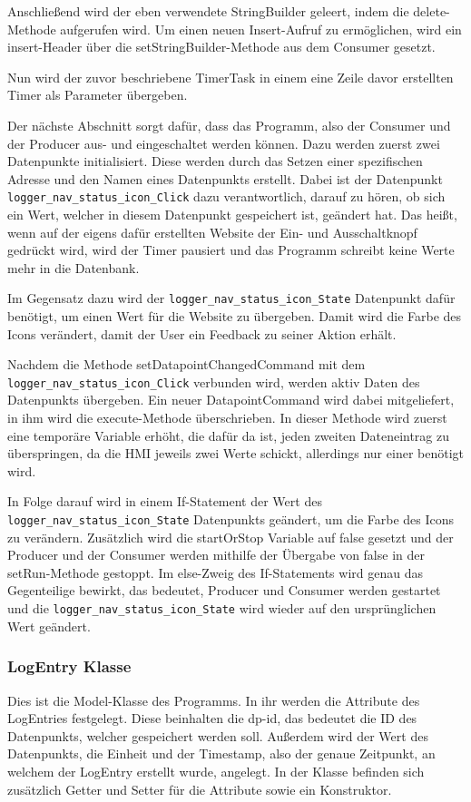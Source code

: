 Anschließend wird der eben verwendete StringBuilder geleert, indem die delete-Methode aufgerufen wird. Um einen neuen Insert-Aufruf zu ermöglichen, wird ein insert-Header über die setStringBuilder-Methode aus dem Consumer gesetzt.


Nun wird der zuvor beschriebene TimerTask in einem eine Zeile davor erstellten Timer als Parameter übergeben.


Der nächste Abschnitt sorgt dafür, dass das Programm, also der Consumer und der Producer aus- und eingeschaltet werden können. Dazu werden zuerst zwei Datenpunkte initialisiert. Diese werden durch das Setzen einer spezifischen Adresse und den Namen eines Datenpunkts erstellt. Dabei ist der Datenpunkt \texttt{logger\_nav\_status\_icon\_Click} dazu verantwortlich, darauf zu hören, ob sich ein Wert, welcher in diesem Datenpunkt gespeichert ist, geändert hat. Das heißt, wenn auf der eigens dafür erstellten Website der Ein- und Ausschaltknopf gedrückt wird, wird der Timer pausiert und das Programm schreibt keine Werte mehr in die Datenbank.


Im Gegensatz dazu wird der \texttt{logger\_nav\_status\_icon\_State} Datenpunkt dafür benötigt, um einen Wert für die Website zu übergeben. Damit wird die Farbe des Icons verändert, damit der User ein Feedback zu seiner Aktion erhält.


Nachdem die Methode setDatapointChangedCommand mit dem \\ \texttt{logger\_nav\_status\_icon\_Click} verbunden wird, werden aktiv Daten des Datenpunkts übergeben. Ein neuer DatapointCommand wird dabei mitgeliefert, in ihm wird die execute-Methode überschrieben. In dieser Methode wird zuerst eine temporäre Variable erhöht, die dafür da ist, jeden zweiten Dateneintrag zu überspringen, da die HMI jeweils zwei Werte schickt, allerdings nur einer benötigt wird.


In Folge darauf wird in einem If-Statement der Wert des \texttt{logger\_nav\_status\_icon\_State} Datenpunkts geändert, um die Farbe des Icons zu verändern. Zusätzlich wird die startOrStop Variable auf false gesetzt und der Producer und der Consumer werden mithilfe der Übergabe von \glq false\grq{} in der setRun-Methode gestoppt. Im else-Zweig des If-Statements wird genau das Gegenteilige bewirkt, das bedeutet, Producer und Consumer werden gestartet und die \texttt{logger\_nav\_status\_icon\_State} wird wieder auf den ursprünglichen Wert geändert.


\subsubsection{LogEntry Klasse}
Dies ist die Model-Klasse des Programms. In ihr werden die Attribute des LogEntries festgelegt. Diese beinhalten die dp-id, das bedeutet die ID des Datenpunkts, welcher gespeichert werden soll. Außerdem wird der Wert des Datenpunkts, die Einheit und der Timestamp, also der genaue Zeitpunkt, an welchem der LogEntry erstellt wurde, angelegt. In der Klasse befinden sich zusätzlich Getter und Setter für die Attribute sowie ein Konstruktor.


